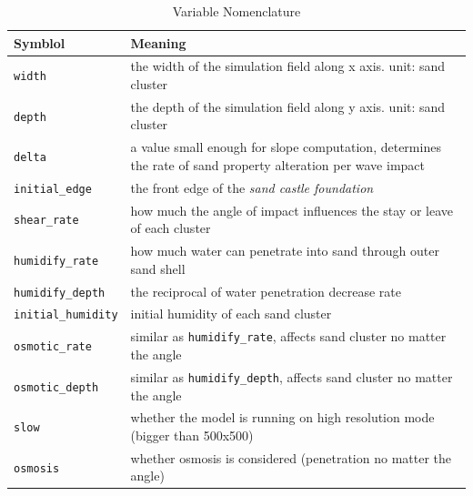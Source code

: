 \documentclass[12pt]{article}
\begin{document}
\begin{table}[H]
    \caption{Variable Nomenclature}
    \vspace{20pt}
    \centering
    \begin{tabular}{p{3cm}p{12cm}}
        \hline
        \textbf{Symblol}           & \textbf{Meaning}                                                                                            \\
        \hline
        \texttt{width}             & the width of the simulation field along x axis. unit: sand cluster                                          \\
        \texttt{depth}             & the depth of the simulation field along y axis. unit: sand cluster                                          \\
        \texttt{delta}             & a value small enough for slope computation, determines the rate of sand property alteration per wave impact \\
        \texttt{initial\_edge}     & the front edge of the \textit{sand castle foundation}                                                       \\
        \texttt{shear\_rate}       & how much the angle of impact influences the stay or leave of each cluster                                   \\
        \texttt{humidify\_rate}    & how much water can penetrate into sand through outer sand shell                                             \\
        \texttt{humidify\_depth}   & the reciprocal of water penetration decrease rate                                                           \\
        \texttt{initial\_humidity} & initial humidity of each sand cluster                                                                       \\
        \texttt{osmotic\_rate}     & similar as \texttt{humidify\_rate}, affects sand cluster no matter the angle                                \\
        \texttt{osmotic\_depth}    & similar as \texttt{humidify\_depth}, affects sand cluster no matter the angle                               \\
        \texttt{slow}              & whether the model is running on high resolution mode (bigger than 500x500)                                  \\
        \texttt{osmosis}           & whether osmosis is considered (penetration no matter the angle)                                             \\
        \hline
    \end{tabular}
    \label{tab:top_view_nomenclature}
\end{table}
\end{document}
